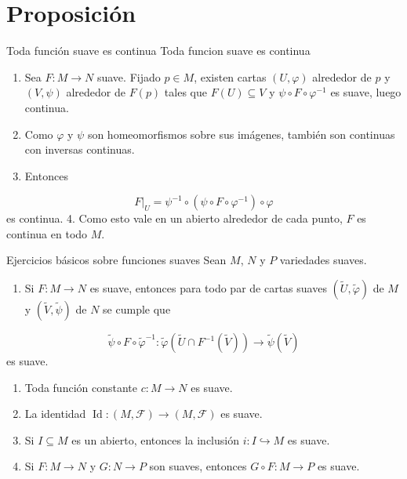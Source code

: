 \section{Proposición}
\begin{bookproposition}{Toda función suave es continua}
Toda funcion suave es continua

\end{bookproposition}
\begin{bookproof}{}
\begin{enumerate}
\item Sea $F:M\to N$ suave. Fijado $p\in M$, existen cartas $(U,\varphi)$ alrededor de $p$ y $(V,\psi)$ alrededor de $F(p)$ tales que $F(U)\subseteq V$ y $\psi\circ F\circ\varphi^{-1}$ es suave, luego continua.
\item Como $\varphi$ y $\psi$ son homeomorfismos sobre sus imágenes, también son continuas con inversas continuas.
\item Entonces
\end{enumerate}
\[
F|_U=\psi^{-1}\circ(\psi\circ F\circ\varphi^{-1})\circ\varphi
\]
es continua. 4. Como esto vale en un abierto alrededor de cada punto, $F$ es continua en todo $M$.

\bookqed
\end{bookproof}
\begin{bookproposition}{Ejercicios básicos sobre funciones suaves}
Sean $M$, $N$ y $P$ variedades suaves.

\begin{enumerate}
\item Si $F:M\to N$ es suave, entonces para todo par de cartas suaves $(\widetilde{U},\widetilde{\varphi})$ de $M$ y $(\widetilde{V},\widetilde{\psi})$ de $N$ se cumple que
\end{enumerate}
\[
\widetilde{\psi}\circ F\circ\widetilde{\varphi}^{-1}:\widetilde{\varphi}(\widetilde{U}\cap F^{-1}(\widetilde{V}))\to\widetilde{\psi}(\widetilde{V})
\]
es suave.

\begin{enumerate}[start=2]
\item Toda función constante $c:M\to N$ es suave.
\item La identidad $\operatorname{Id}:(M,\mathcal{F})\to(M,\mathcal{F})$ es suave.
\item Si $I\subseteq M$ es un abierto, entonces la inclusión $i:I\hookrightarrow M$ es suave.
\item Si $F:M\to N$ y $G:N\to P$ son suaves, entonces $G\circ F:M\to P$ es suave.
\end{enumerate}
\end{bookproposition}
